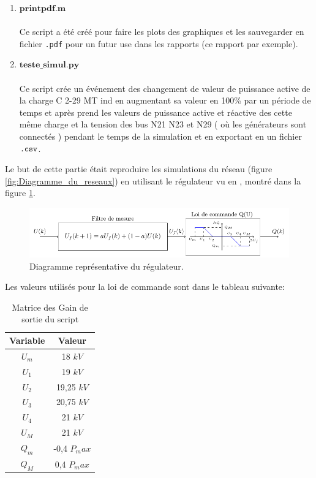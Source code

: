 \begin{enumerate}[\bfseries 4.3.1]
	\\
	\item $\mathbf{printpdf.m}$\\
	\\Ce script a été créé pour faire les plots des graphiques et les sauvegarder en fichier \verb|.pdf| pour un futur use dans les rapports (ce rapport par exemple). 
	\\
	\item $\mathbf{teste\_simul.py}$\\
	\\Ce script crée un événement des changement de valeur de puissance active de la charge C 2-29 MT ind en augmentant sa valeur en 100\% par un période de temps et après prend les valeurs de puissance active et réactive des cette même charge et la tension des bus N21 N23 et N29 ( où les générateurs sont connectés ) pendant le temps de la simulation et en exportant en un fichier $ \verb|.csv| $.
	\\ 
\end{enumerate}

Le but de cette partie était reproduire les simulations du réseau (figure \ref{fig:Diagramme_du_reseaux}) en utilisant le régulateur vu en \cite{cosson:tel-01374469}, montré dans la figure \ref{fig:regulateur}.

\begin{figure}[H]
	\centering
	\includegraphics[]{Figuras/Methodologie/partie_4/regulateur}
	\caption{Diagramme représentative du régulateur.}
	\label{fig:regulateur}
\end{figure}

Les valeurs utilisés pour la loi de commande sont dans le tableau suivante:
\begin{table}[H]
	\captionsetup{justification=centering,margin=0cm}
\caption{Matrice des Gain de sortie du script}
\centering
\label{tab:valeurs_loicommande}
\begin{tabular}{|c|c|}
	\hline
Variable&Valeur\\
	\hline
$ U_m $&18 $kV$\\
	\hline
$ U_1 $&19 $kV$\\
	\hline
$ U_2 $&19,25 $kV$\\
	\hline
$ U_3 $&20,75 $kV$\\
	\hline
$ U_4 $&21 $kV$\\
	\hline
$ U_M $&21 $kV$\\
	\hline
$ Q_m $&-0,4 $ P_max $\\
	\hline
$ Q_M $&0,4 $ P_max $\\
	\hline
\end{tabular}
\end{table}


